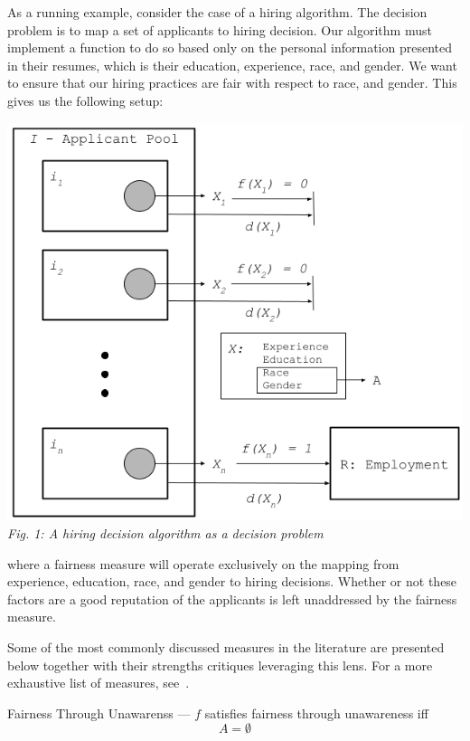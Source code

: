 As a running example, consider the case of a hiring algorithm. The decision
problem is to map a set of applicants to hiring decision. Our algorithm must
implement a function to do so based only on the personal information presented
in their resumes, which is their education, experience, race, and gender. We
want to ensure that our hiring practices are fair with respect to race, and
gender. This gives us the following setup:
\begin{center}
    \includegraphics[scale=.4]{figs/fig1.png}\\
    \emph{Fig. 1: A hiring decision algorithm as a decision problem}\\
\end{center}
where a fairness measure will operate exclusively on the mapping from
experience, education, race, and gender to hiring decisions. Whether or not
these factors are a good reputation of the applicants is left unaddressed by
the fairness measure.

Some of the most commonly discussed measures in the literature are presented
below together with their strengths critiques leveraging this lens. For a more
exhaustive list of measures, see~\cite{CorbettDavies_2023}.

\begin{definition}
    Fairness Through Unawarenss — $f$ satisfies fairness through unawareness iff
    \[A = \emptyset\]
\end{definition}

